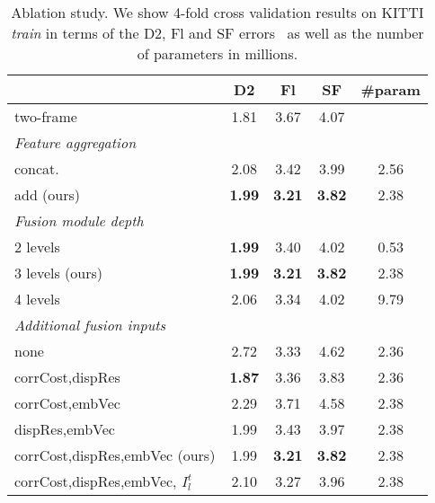 \documentclass[10pt,twocolumn,letterpaper]{article}
\begin{document}
\begin{table}
\caption{Ablation study. We show 4-fold cross validation results on KITTI \emph{train} in terms of the D2, Fl and SF errors~\cite{Menze2015_KITTI} as well as the number of parameters in millions.}
\label{tab:ablations}
\begin{center}
{\setlength\tabcolsep{2.7pt}
\begin{tabular}{lcccc}
\toprule
& D2 & Fl & SF & \#param\!
\\
\midrule
\midrule
two-frame & 1.81 & 3.67 & 4.07
\\
\midrule
\midrule
\multicolumn{4}{l}{\emph{Feature aggregation}}
\\
\midrule
concat. & 2.08 & 3.42 & 3.99 & 2.56
\\
add (ours) & \textbf{1.99} & \textbf{3.21} & \textbf{3.82} & 2.38
\\
\midrule
\midrule
\multicolumn{4}{l}{\emph{Fusion module depth}}
\\
\midrule
2 levels & \textbf{1.99} & 3.40 & 4.02 & 0.53
\\
3 levels (ours) & \textbf{1.99} & \textbf{3.21} & \textbf{3.82} & 2.38
\\
4 levels & 2.06 & 3.34 & 4.02 & 9.79
\\
\midrule
\midrule
\multicolumn{4}{l}{\emph{Additional fusion inputs}}
\\
\midrule
none & 2.72 & 3.33 & 4.62 & 2.36
\\
corrCost,dispRes & \textbf{1.87} & 3.36 & 3.83 & 2.36
\\
corrCost,embVec & 2.29 & 3.71 & 4.58 & 2.38
\\
dispRes,embVec & 1.99 & 3.43 & 3.97 & 2.38
\\
corrCost,dispRes,embVec (ours) & 1.99 & \textbf{3.21} & \textbf{3.82} & 2.38
\\
corrCost,dispRes,embVec, $I^{t}_l$ & 2.10 & 3.27 & 3.96 & 2.38
\\
\bottomrule
\end{tabular}
}
\end{center}
\end{table}
\end{document}
